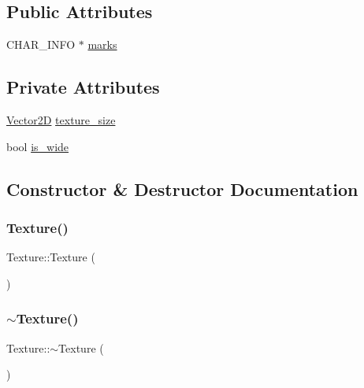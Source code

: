 \subsection*{Public Attributes}
\begin{DoxyCompactItemize}
\item 
C\+H\+A\+R\+\_\+\+I\+N\+FO $\ast$ \mbox{\hyperlink{classsc_1_1_texture_a00634305ca8c383f7f7deeada668efcf}{marks}}
\end{DoxyCompactItemize}
\subsection*{Private Attributes}
\begin{DoxyCompactItemize}
\item 
\mbox{\hyperlink{classsc_1_1_vector2_d}{Vector2D}} \mbox{\hyperlink{classsc_1_1_texture_abceb81354b704cd1a91a653449220349}{texture\+\_\+size}}
\item 
bool \mbox{\hyperlink{classsc_1_1_texture_a2b0cd20094fff3916e99fd2a9a673840}{is\+\_\+wide}}
\end{DoxyCompactItemize}


\subsection{Constructor \& Destructor Documentation}
\mbox{\label{classsc_1_1_texture_a6c275e3f186675ff6ed73ccf970e552f}} 
\subsubsection{\texorpdfstring{Texture()}{Texture()}}
{\footnotesize\ttfamily Texture\+::\+Texture (\begin{DoxyParamCaption}{ }\end{DoxyParamCaption})}

\mbox{\label{classsc_1_1_texture_a09c4bcb7462f64c1d20fa69dba3cee8a}} 
\subsubsection{\texorpdfstring{$\sim$Texture()}{~Texture()}}
{\footnotesize\ttfamily Texture\+::$\sim$\+Texture (\begin{DoxyParamCaption}{ }\end{DoxyParamCaption})}



